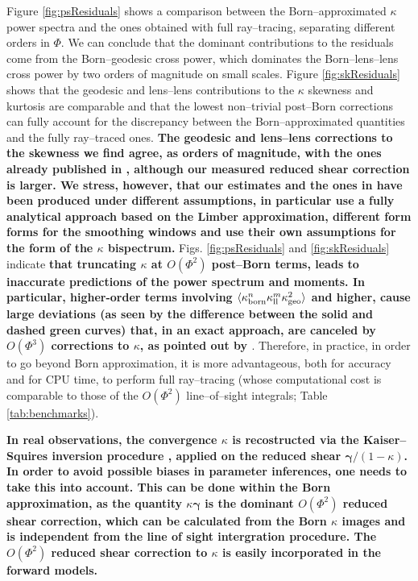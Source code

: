 \documentclass[reprint,aps,prd,superscriptaddress,showkeys,showpacs]{revtex4-1}
\begin{document}
Figure \ref{fig:psResiduals} shows a comparison between the Born--approximated $\kappa$ power spectra and the ones obtained with full ray--tracing, separating different orders in $\Phi$. We can conclude that the dominant contributions to the residuals come from the Born--geodesic cross power, which dominates the Born--lens--lens cross power by two orders of magnitude on small scales. Figure \ref{fig:skResiduals} shows that the geodesic and lens--lens contributions to the $\kappa$ skewness and kurtosis are comparable and that the lowest non--trivial post--Born corrections can fully account for the discrepancy between the Born--approximated quantities and the fully ray--traced ones. \textbf{\color{red} The geodesic and lens--lens corrections to the skewness we find agree, as orders of magnitude, with the ones already published in \citep{WLBispectrumDodelson}, although our measured reduced shear correction is larger. We stress, however, that our estimates and the ones in \citep{WLBispectrumDodelson} have been produced under different assumptions, in particular \citep{WLBispectrumDodelson} use a fully analytical approach based on the Limber approximation, different form forms for the smoothing windows and use their own assumptions for the form of the $\kappa$ bispectrum.} Figs. \ref{fig:psResiduals} and \ref{fig:skResiduals} indicate \textbf{\color{red} that truncating $\kappa$ at $O(\Phi^2)$ post--Born terms, leads to inaccurate predictions of the power spectrum and moments. In particular, higher-order terms involving $\langle \kappa_{\rm born}^n \kappa_{\rm ll}^m \kappa_{\rm geo}^2\rangle$ and higher, cause large deviations (as seen by the difference between the solid and dashed green curves) that, in an exact approach, are canceled by $O(\Phi^3)$ corrections to $\kappa$, as pointed out by \citep{HirataKrause,CMBPrattenLewis,ScoccimarroLoop}}. Therefore, in practice, in order to go beyond Born approximation, it is more advantageous, both for accuracy and for CPU time, to perform full ray--tracing (whose computational cost is comparable to those of the $O(\Phi^2)$ line--of--sight integrals; Table \ref{tab:benchmarks}).

\textbf{\color{red} In real observations, the convergence $\kappa$ is recostructed via the Kaiser--Squires inversion procedure \citep{KaiserSquires}, applied on the reduced shear $\pmb{\gamma}/(1-\kappa)$. In order to avoid possible biases in parameter inferences, one needs to take this into account. This can be done within the Born approximation, as the quantity $\kappa\pmb{\gamma}$ is the dominant $O(\Phi^2)$ reduced shear correction, which can be calculated from the Born $\kappa$ images and is independent from the line of sight intergration procedure. The $O(\Phi^2)$ reduced shear correction to $\kappa$ is easily incorporated in the forward models.}
\end{document}
